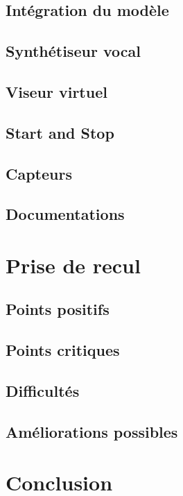 \documentclass[UTF8]{EPURapport}
\begin{document}
\section{Intégration du modèle}

\section{Synthétiseur vocal}

\section{Viseur virtuel}

\section{Start and Stop}

\section{Capteurs}

\section{Documentations}

\chapter{Prise de recul}

\section{Points positifs}

\section{Points critiques}

\section{Difficultés}

\section{Améliorations possibles}

\chapter{Conclusion}

\annexes
\end{document}
